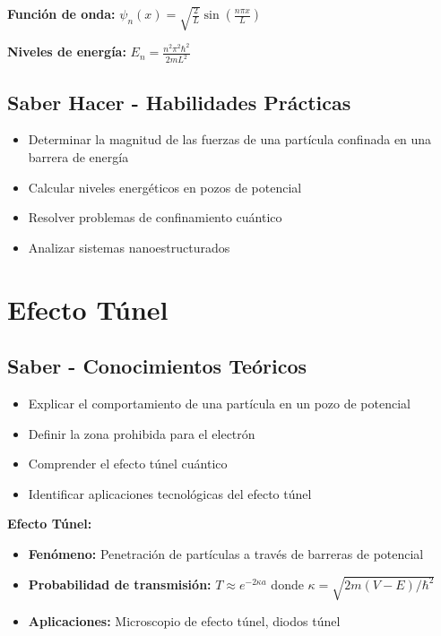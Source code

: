 \documentclass[12pt,a4paper,twoside]{book}
\begin{document}
	\begin{ecuacionbox}
		\textbf{Función de onda:}
		$\psi_n(x) = \sqrt{\frac{2}{L}} \sin\left(\frac{n\pi x}{L}\right)$
		
		\textbf{Niveles de energía:}
		$E_n = \frac{n^2 \pi^2 \hbar^2}{2mL^2}$
	\end{ecuacionbox}
	
	\subsection{Saber Hacer - Habilidades Prácticas}
	\begin{hacerbox}
		\begin{itemize}
			\item Determinar la magnitud de las fuerzas de una partícula confinada en una barrera de energía
			\item Calcular niveles energéticos en pozos de potencial
			\item Resolver problemas de confinamiento cuántico
			\item Analizar sistemas nanoestructurados
		\end{itemize}
	\end{hacerbox}
	
	\section{Efecto Túnel}
	\label{sec:efecto_tunel}
	
	\subsection{Saber - Conocimientos Teóricos}
	\begin{saberbox}
		\begin{itemize}
			\item Explicar el comportamiento de una partícula en un pozo de potencial
			\item Definir la zona prohibida para el electrón
			\item Comprender el efecto túnel cuántico
			\item Identificar aplicaciones tecnológicas del efecto túnel
		\end{itemize}
	\end{saberbox}
	
	\begin{experimentobox}
		\textbf{Efecto Túnel:}
		\begin{itemize}
			\item \textbf{Fenómeno:} Penetración de partículas a través de barreras de potencial
			\item \textbf{Probabilidad de transmisión:} $T \approx e^{-2\kappa a}$ donde $\kappa = \sqrt{2m(V-E)/\hbar^2}$
			\item \textbf{Aplicaciones:} Microscopio de efecto túnel, diodos túnel
		\end{itemize}
	\end{experimentobox}
	
\end{document}

